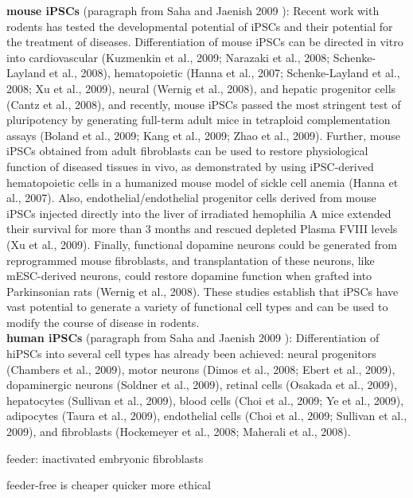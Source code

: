 \textbf{mouse iPSCs} (paragraph from Saha and Jaenish 2009 \cite{saha2009technical}):
Recent work with rodents has tested the developmental potential of iPSCs and their potential for the treatment of diseases. Differentiation of mouse iPSCs can be directed in vitro into cardiovascular (Kuzmenkin et al., 2009; Narazaki et al., 2008; Schenke-Layland et al., 2008), hematopoietic (Hanna et al., 2007; Schenke-Layland et al., 2008; Xu et al., 2009), neural (Wernig et al., 2008), and hepatic progenitor cells (Cantz et al., 2008), and recently, mouse iPSCs passed the most stringent test of pluripotency by generating full-term adult mice in tetraploid complementation assays (Boland et al., 2009; Kang et al., 2009; Zhao et al., 2009). Further, mouse iPSCs obtained from adult fibroblasts can be used to restore physiological function of diseased tissues in vivo, as demonstrated by using iPSC-derived hematopoietic cells in a humanized mouse model of sickle cell anemia (Hanna et al., 2007). Also, endothelial/endothelial progenitor cells derived from mouse iPSCs injected directly into the liver of irradiated hemophilia A mice extended their survival for more than 3 months and rescued depleted Plasma FVIII levels (Xu et al., 2009). Finally, functional dopamine neurons could be generated from reprogrammed mouse fibroblasts, and transplantation of these neurons, like mESC-derived neurons, could restore dopamine function when grafted into Parkinsonian rats (Wernig et al., 2008). These studies establish that iPSCs have vast potential to generate a variety of functional cell types and can be used to modify the course of disease in rodents.\\

\textbf{human iPSCs} (paragraph from Saha and Jaenish 2009 \cite{saha2009technical}):
Differentiation of hiPSCs into several cell types has already been achieved: neural progenitors (Chambers et al., 2009), motor neurons (Dimos et al., 2008; Ebert et al., 2009), dopaminergic neurons (Soldner et al., 2009), retinal cells (Osakada et al., 2009), hepatocytes (Sullivan et al., 2009), blood cells (Choi et al., 2009; Ye et al., 2009), adipocytes (Taura et al., 2009), endothelial cells (Choi et al., 2009; Sullivan et al., 2009), and fibroblasts (Hockemeyer et al., 2008; Maherali et al., 2008). 





feeder: inactivated embryonic fibroblasts

feeder-free is cheaper quicker more ethical


